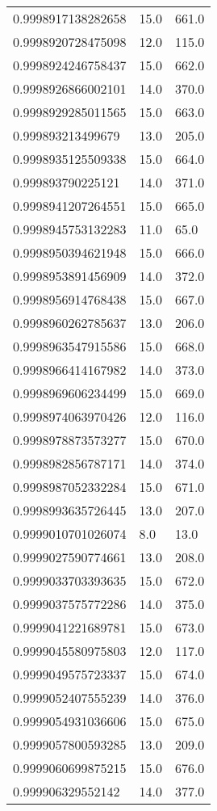 \begin{center}
\begin{supertabular}[H]{p{0.30\textwidth}p{0.05\textwidth}p{0.05\textwidth}}
0.9998917138282658 & 15.0 & 661.0 \\ 
0.9998920728475098 & 12.0 & 115.0 \\ 
0.9998924246758437 & 15.0 & 662.0 \\ 
0.9998926866002101 & 14.0 & 370.0 \\ 
0.9998929285011565 & 15.0 & 663.0 \\ 
0.999893213499679 & 13.0 & 205.0 \\ 
0.9998935125509338 & 15.0 & 664.0 \\ 
0.999893790225121 & 14.0 & 371.0 \\ 
0.9998941207264551 & 15.0 & 665.0 \\ 
0.9998945753132283 & 11.0 & 65.0 \\ 
0.9998950394621948 & 15.0 & 666.0 \\ 
0.9998953891456909 & 14.0 & 372.0 \\ 
0.9998956914768438 & 15.0 & 667.0 \\ 
0.9998960262785637 & 13.0 & 206.0 \\ 
0.9998963547915586 & 15.0 & 668.0 \\ 
0.9998966414167982 & 14.0 & 373.0 \\ 
0.9998969606234499 & 15.0 & 669.0 \\ 
0.9998974063970426 & 12.0 & 116.0 \\ 
0.9998978873573277 & 15.0 & 670.0 \\ 
0.9998982856787171 & 14.0 & 374.0 \\ 
0.9998987052332284 & 15.0 & 671.0 \\ 
0.9998993635726445 & 13.0 & 207.0 \\ 
0.9999010701026074 & 8.0 & 13.0 \\ 
0.9999027590774661 & 13.0 & 208.0 \\ 
0.9999033703393635 & 15.0 & 672.0 \\ 
0.9999037575772286 & 14.0 & 375.0 \\ 
0.9999041221689781 & 15.0 & 673.0 \\ 
0.9999045580975803 & 12.0 & 117.0 \\ 
0.9999049575723337 & 15.0 & 674.0 \\ 
0.9999052407555239 & 14.0 & 376.0 \\ 
0.9999054931036606 & 15.0 & 675.0 \\ 
0.9999057800593285 & 13.0 & 209.0 \\ 
0.9999060699875215 & 15.0 & 676.0 \\ 
0.999906329552142 & 14.0 & 377.0 \\ 

\end{supertabular}
\end{center}
